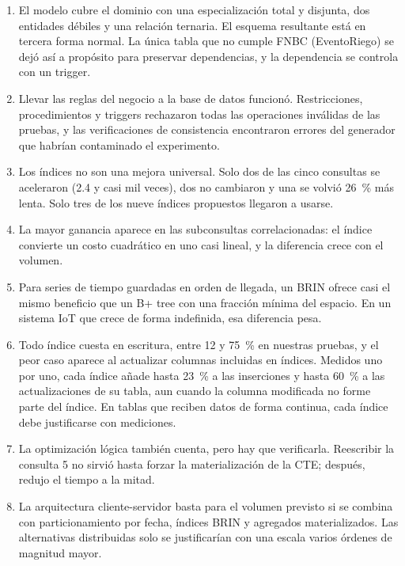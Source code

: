\documentclass[11pt,letterpaper]{article}
\newcommand{\tbus}{\textunderscore\allowbreak}
\newcommand{\tb}[1]{{\ttfamily\let\_\tbus #1}}
\begin{document}
\begin{enumerate}[leftmargin=1.6em,itemsep=0.25em]
\item El modelo cubre el dominio con una especialización total y disjunta, dos entidades débiles y una relación ternaria. El esquema resultante está en tercera forma normal. La única tabla que no cumple FNBC (\tb{Evento\_Riego}) se dejó así a propósito para preservar dependencias, y la dependencia se controla con un trigger.
\item Llevar las reglas del negocio a la base de datos funcionó. Restricciones, procedimientos y triggers rechazaron todas las operaciones inválidas de las pruebas, y las verificaciones de consistencia encontraron errores del generador que habrían contaminado el experimento.
\item Los índices no son una mejora universal. Solo dos de las cinco consultas se aceleraron (2.4 y casi mil veces), dos no cambiaron y una se volvió 26~\% más lenta. Solo tres de los nueve índices propuestos llegaron a usarse.
\item La mayor ganancia aparece en las subconsultas correlacionadas: el índice convierte un costo cuadrático en uno casi lineal, y la diferencia crece con el volumen.
\item Para series de tiempo guardadas en orden de llegada, un BRIN ofrece casi el mismo beneficio que un B+ tree con una fracción mínima del espacio. En un sistema IoT que crece de forma indefinida, esa diferencia pesa.
\item Todo índice cuesta en escritura, entre 12 y 75~\% en nuestras pruebas, y el peor caso aparece al actualizar columnas incluidas en índices. Medidos uno por uno, cada índice añade hasta 23~\% a las inserciones y hasta 60~\% a las actualizaciones de su tabla, aun cuando la columna modificada no forme parte del índice. En tablas que reciben datos de forma continua, cada índice debe justificarse con mediciones.
\item La optimización lógica también cuenta, pero hay que verificarla. Reescribir la consulta 5 no sirvió hasta forzar la materialización de la CTE; después, redujo el tiempo a la mitad.
\item La arquitectura cliente-servidor basta para el volumen previsto si se combina con particionamiento por fecha, índices BRIN y agregados materializados. Las alternativas distribuidas solo se justificarían con una escala varios órdenes de magnitud mayor.
\end{enumerate}

\end{document}

